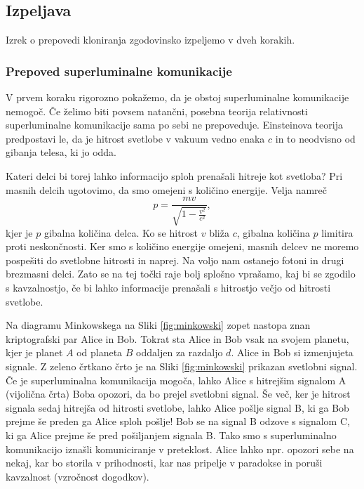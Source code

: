 \documentclass[12pt]{article}
\begin{document}
 \subsection{Izpeljava}
Izrek o prepovedi kloniranja zgodovinsko izpeljemo v dveh korakih. 
\subsubsection{Prepoved superluminalne komunikacije}
V prvem koraku rigorozno pokažemo, da je obstoj superluminalne komunikacije nemogoč. Če želimo biti povsem natančni, posebna teorija relativnosti superluminalne komunikacije sama po sebi ne prepoveduje. Einsteinova teorija predpostavi le, da je hitrost svetlobe v vakuum vedno enaka $c$ in to neodvisno od gibanja telesa, ki jo odda. \par Kateri delci bi torej lahko informacijo sploh prenašali hitreje kot svetloba? Pri masnih delcih ugotovimo, da smo omejeni s količino energije. Velja namreč
\begin{equation}
p = \frac{mv}{\sqrt{1-\frac{v^2}{c^2}}},
\end{equation}
kjer je $p$ gibalna količina delca. Ko se hitrost $v$ bliža $c$, gibalna količina $p$ limitira proti neskončnosti. Ker smo s količino energije omejeni, masnih delcev ne moremo pospešiti do svetlobne hitrosti in naprej. Na voljo nam ostanejo fotoni in drugi brezmasni delci. Zato se na tej točki raje bolj splošno vprašamo, kaj bi se zgodilo s kavzalnostjo, če bi lahko informacije prenašali s hitrostjo večjo od hitrosti svetlobe. \cite{marcocerezoEntangledParticlesFaster2015}
\par
Na diagramu Minkowskega na Sliki \ref{fig:minkowski} zopet nastopa znan kriptografski par Alice in Bob. Tokrat sta Alice in Bob vsak na svojem planetu, kjer je planet $A$ od planeta $B$ oddaljen za razdaljo $d$. Alice in Bob si izmenjujeta signale. Z zeleno črtkano črto je na Sliki \ref{fig:minkowski} prikazan svetlobni signal. Če je superluminalna komunikacija mogoča, lahko Alice s hitrejšim signalom A (vijolična črta) Boba opozori, da bo prejel svetlobni signal. Še več, ker je hitrost signala sedaj hitrejša od hitrosti svetlobe, lahko Alice pošlje signal B, ki ga Bob prejme še preden ga Alice sploh pošlje! Bob se na signal B odzove s signalom C, ki ga Alice prejme še pred pošiljanjem signala B. Tako smo s superluminalno komunikacijo iznašli komuniciranje v preteklost. Alice lahko npr. opozori sebe na nekaj, kar bo storila v prihodnosti, kar nas pripelje v paradokse in poruši kavzalnost (vzročnost dogodkov). \cite{marcocerezoEntangledParticlesFaster2015}
\end{document}
